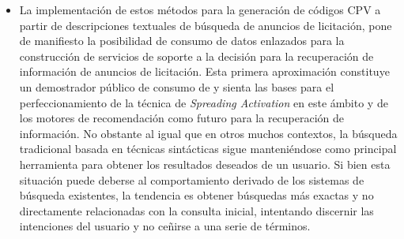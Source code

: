 \begin{itemize}
\item La implementación de estos métodos para la generación de códigos CPV a partir de descripciones textuales de búsqueda 
de anuncios de licitación, pone de manifiesto la posibilidad de consumo de datos enlazados para la construcción de servicios 
de soporte a la decisión para la recuperación de información de anuncios de licitación. Esta primera aproximación constituye 
un demostrador público de consumo de \linkeddata y sienta las bases para el perfeccionamiento de la técnica de \textit{Spreading Activation} 
en este ámbito y de los motores de recomendación como futuro para la recuperación de información. No obstante al igual que en otros muchos contextos, la búsqueda tradicional basada en técnicas sintácticas sigue manteniéndose como 
principal herramienta para obtener los resultados deseados de un usuario. Si bien esta situación puede deberse 
al comportamiento derivado de los sistemas de búsqueda existentes, la tendencia es obtener búsquedas 
más exactas y no directamente relacionadas con la consulta inicial, intentando discernir las intenciones del usuario 
y no ceñirse a una serie de términos.
\end{itemize}

